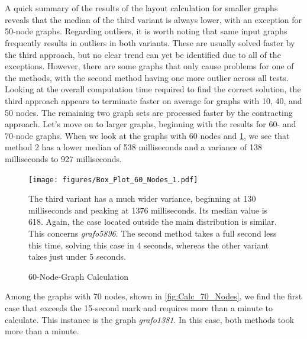 \documentclass[bachelor, english]{algothesis}
\begin{document}
\\
\\
A quick summary of the results of the layout calculation for smaller graphs reveals that the median of the third variant is always lower, with an exception for 50-node graphs. Regarding outliers, it is worth noting that same input graphs frequently results in outliers in both variants. These are usually solved faster by the third approach, but no clear trend can yet be identified due to all of the exceptions. However, there are some graphs that only cause problems for one of the methods, with the second method having one more outlier across all tests. Looking at the overall computation time required to find the correct solution, the third approach appears to terminate faster on average for graphs with 10, 40, and 50 nodes. The remaining two graph sets are processed faster by the contracting approach.
\newline
\newline
\noindent
Let's move on to larger graphs, beginning with the results for 60- and 70-node graphs. When we look at the graphs with 60 nodes and \cref{fig:Calc_60_Nodes}, we see that method 2 has a lower median of 538 milliseconds and a variance of 138 milliseconds to 927 milliseconds.
\begin{figure}[ht]
  \centering
  \begin{minipage}{0.5\textwidth}
          \hspace{-1.2cm}
            \texttt{[image: figures/Box\_Plot\_60\_Nodes\_1.pdf]} 
  \caption{60-Node-Graph Calculation}
  \label{fig:Calc_60_Nodes}
  \end{minipage}%
  \begin{minipage}{0.42\textwidth}
         \vspace{-0.3cm}
The third variant has a much wider variance, beginning at 130 milliseconds and peaking at 1376 milliseconds. Its median value is 618. Again, the case located outside the main distribution is similar. This concerns \textit{grafo5896}. The second method takes a full second less this time, solving this case in 4 seconds, whereas the other variant takes just under 5 seconds.
  \end{minipage}
\end{figure}
\noindent
\newline
Among the graphs with 70 nodes, shown in \cref{fig:Calc_70_Nodes}, we find the first case that exceeds the 15-second mark and requires more than a minute to calculate. This instance is the graph \textit{grafo1381}. In this case, both methods took more than a minute. 
\end{document}
